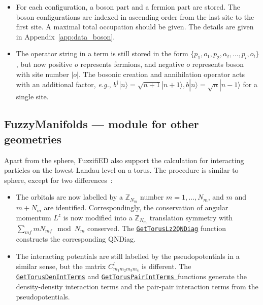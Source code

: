 \documentclass{timesjhep}
\begin{document}
\begin{itemize}
    \item For each configuration, a boson part and a fermion part are stored. The boson configurations are indexed in ascending order from the last site to the first site. A maximal total occupation should be given. The details are given in Appendix~\ref{app:data_boson}.
    \item The operator string in a term is still stored in the form $\{p_1,o_1,p_2,o_2,\dots,p_l,o_l\}$, but now positive $o$ represents fermions, and negative $o$ represents boson with site number $|o|$. The bosonic creation and annihilation operator acts with an additional factor, \textit{e.g.}, $b^\dagger|n\rangle=\sqrt{n+1}|n+1\rangle,b|n\rangle=\sqrt{n}|n-1\rangle$ for a single site.
\end{itemize}

\subsection{FuzzyManifolds --- module for other geometries}
\label{sec:ed_manifolds}

Apart from the sphere, FuzzifiED also support the calculation for interacting particles on the lowest Landau level on a torus. The procedure is similar to sphere, except for two differences~:
\begin{itemize}
    \item The orbitals are now labelled by a $\mathbb{Z}_{N_m}$ number $m=1,\dots,N_m$, and $m$ and $m+N_m$ are identified. Correspondingly, the conservation of angular momentum $L^z$ is now modified into a $\mathbb{Z}_{N_m}$ translation symmetry with $\sum_{mf}mN_{mf}\mod N_m$ conserved. The \href{https://docs.fuzzified.world/manifolds/#FuzzifiED.FuzzyManifolds.GetTorusLz2QNDiag-Tuple{Int64,\%20Int64}}{\lstinline|GetTorusLz2QNDiag|} function constructs the corresponding QNDiag.
    \item The interacting potentials are still labelled by the pseudopotentials in a similar sense, but the matrix $C_{m_1m_2m_3m_4}^l$ is different. The \href{https://docs.fuzzified.world/manifolds/#FuzzifiED.FuzzyManifolds.GetTorusDenIntTerms}{\lstinline|GetTorusDenIntTerms|} and \href{https://docs.fuzzified.world/manifolds/#FuzzifiED.FuzzyManifolds.GetTorusPairIntTerms}{\lstinline|GetTorusPairIntTerms |}functions generate the density-density interaction terms and the pair-pair interaction terms from the pseudopotentials.
\end{itemize}
\end{document}
